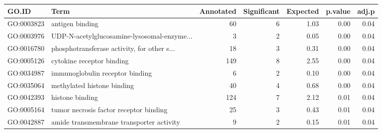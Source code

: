 \begin{table}[ht]
\centering
\begin{tabular}{llrrrrr}
  \hline
GO.ID & Term & Annotated & Significant & Expected & p.value & adj.p \\ 
  \hline
GO:0003823 & antigen binding &  60 &   6 & 1.03 & 0.00 & 0.04 \\ 
  GO:0003976 & UDP-N-acetylglucosamine-lysosomal-enzyme... &   3 &   2 & 0.05 & 0.00 & 0.04 \\ 
  GO:0016780 & phosphotransferase activity, for other s... &  18 &   3 & 0.31 & 0.00 & 0.04 \\ 
  GO:0005126 & cytokine receptor binding & 149 &   8 & 2.55 & 0.00 & 0.04 \\ 
  GO:0034987 & immunoglobulin receptor binding &   6 &   2 & 0.10 & 0.00 & 0.04 \\ 
  GO:0035064 & methylated histone binding &  40 &   4 & 0.68 & 0.00 & 0.04 \\ 
  GO:0042393 & histone binding & 124 &   7 & 2.12 & 0.01 & 0.04 \\ 
  GO:0005164 & tumor necrosis factor receptor binding &  25 &   3 & 0.43 & 0.01 & 0.04 \\ 
  GO:0042887 & amide transmembrane transporter activity &   9 &   2 & 0.15 & 0.01 & 0.04 \\ 
   \hline
\end{tabular}
\end{table}
